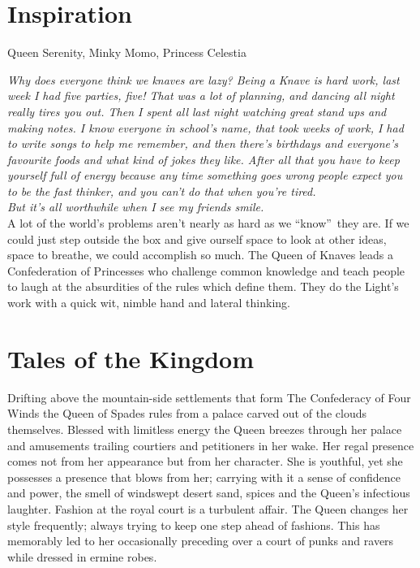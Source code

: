 \section*{Inspiration}
Queen Serenity, Minky Momo, Princess Celestia

\newpage{}

\noindent \textit{Why does everyone think we knaves are lazy? Being a Knave is hard work, last week I had five parties, five! That was a lot of planning, and dancing all night really tires you out. Then I spent all last night watching great stand ups and making notes. I know everyone in school's name, that took weeks of work, I had to write songs to help me remember, and then there's birthdays and everyone's favourite foods and what kind of jokes they like. After all that you have to keep yourself full of energy because any time something goes wrong people expect you to be the fast thinker, and you can't do that when you're tired. }\\

\noindent \textit{But it's all worthwhile when I see my friends smile.}\\

\noindent A lot of the world's problems aren't nearly as hard as we \textquotedblleft know\textquotedblright\, they are. If we could just step outside the box and give ourself space to look at other ideas, space to breathe, we could accomplish so much. The Queen of Knaves leads a Confederation of Princesses who challenge common knowledge and teach people to laugh at the absurdities of the rules which define them. They do the Light's work with a quick wit, nimble hand and lateral thinking. 

\section*{Tales of the Kingdom}

Drifting above the mountain-side settlements that form The Confederacy of Four Winds the Queen of Spades rules from a palace carved out of the clouds themselves. Blessed with limitless energy the Queen breezes through her palace and amusements trailing courtiers and petitioners in her wake. Her regal presence comes not from her appearance but from her character. She is youthful, yet she possesses a presence that blows from her; carrying with it a sense of confidence and power, the smell of windswept desert sand, spices and the Queen's infectious laughter. Fashion at the royal court is a turbulent affair. The Queen changes her style frequently; always trying to keep one step ahead of fashions. This has memorably led to her occasionally preceding over a court of punks and ravers while dressed in ermine robes.

